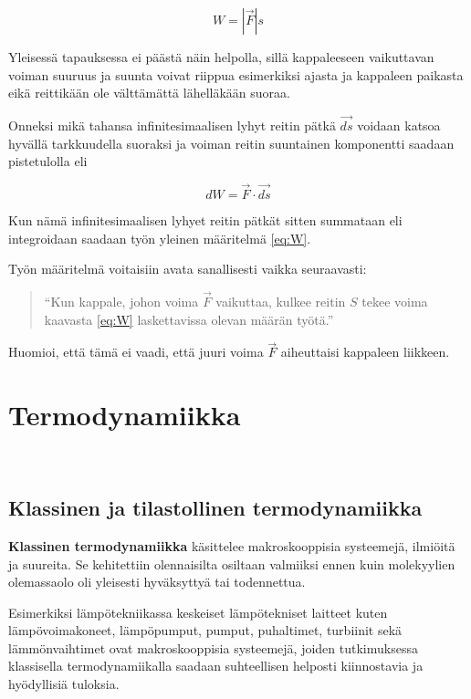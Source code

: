 \documentclass[12pt,a4paper,finnish]{book}
\begin{document}
\begin{equation}
 W = |\vec{F}|s
\end{equation}

Yleisessä tapauksessa ei päästä näin helpolla, sillä kappaleeseen vaikuttavan voiman suuruus ja suunta voivat 
riippua esimerkiksi ajasta ja kappaleen paikasta eikä reittikään ole välttämättä lähelläkään suoraa. 

Onneksi 
mikä tahansa infinitesimaalisen lyhyt reitin pätkä $\vec{ds}$ voidaan katsoa hyvällä tarkkuudella suoraksi ja 
voiman reitin suuntainen komponentti saadaan pistetulolla eli

\begin{equation}
 dW = \vec{F} \cdot \vec{ds}
\end{equation}

Kun nämä infinitesimaalisen lyhyet reitin pätkät sitten summataan eli integroidaan saadaan työn yleinen määritelmä 
\ref{eq:W}.

Työn määritelmä voitaisiin avata sanallisesti vaikka seuraavasti:

\begin{quotation}
``Kun kappale, johon voima $\vec{F}$ vaikuttaa, kulkee 
reitin $S$ tekee voima kaavasta \ref{eq:W} laskettavissa olevan määrän työtä.''
\end{quotation}

 Huomioi, että tämä ei vaadi, että 
juuri voima $\vec{F}$ aiheuttaisi kappaleen liikkeen.

\part{Termodynamiikka} %
\setcounter{chapter}{0}

~\cite{4laws}~\cite{stattherintro}~\cite{thermoeng}~\cite{ltp1}

\chapter{Klassinen ja tilastollinen termodynamiikka} %

\textbf{Klassinen termodynamiikka} käsittelee makroskooppisia systeemejä, ilmiöitä ja suureita. Se kehitettiin 
olennaisilta osiltaan valmiiksi ennen kuin molekyylien olemassaolo oli yleisesti hyväksyttyä tai todennettua. 

Esimerkiksi lämpötekniikassa keskeiset lämpötekniset laitteet kuten lämpövoimakoneet, 
lämpöpumput, pumput, puhaltimet, turbiinit sekä lämmönvaihtimet ovat makroskooppisia systeemejä, joiden 
tutkimuksessa klassisella termodynamiikalla saadaan suhteellisen helposti kiinnostavia ja hyödyllisiä tuloksia.
\end{document}
